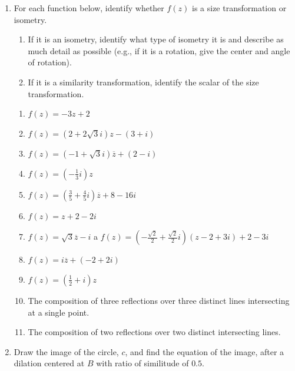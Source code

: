 \documentclass[
]{book}
\providecommand{\tightlist}{%
  \setlength{\itemsep}{0pt}\setlength{\parskip}{0pt}}
\theoremstyle{definition}
\theoremstyle{definition}
\theoremstyle{definition}
\theoremstyle{definition}
\theoremstyle{remark}
\begin{document}
\begin{enumerate}
\def\labelenumi{\arabic{enumi}.}
\item
  For each function below, identify whether \(f(z)\) is a size transformation or isometry.

  \begin{enumerate}
  \def\labelenumii{\roman{enumii}.}
  \tightlist
  \item
    If it is an isometry, identify what type of isometry it is and describe as much detail as possible (e.g., if it is a rotation, give the center and angle of rotation).
  \item
    If it is a similarity transformation, identify the scalar of the size transformation.
  \end{enumerate}

  \begin{enumerate}
  \def\labelenumii{\alph{enumii}.}
  \tightlist
  \item
    \({\displaystyle f(z)= -3z+2 }\)
  \item
    \({\displaystyle f(z)= (2+2\sqrt{3}i)z - (3+i)}\)
  \item
    \({\displaystyle f(z)= (-1+\sqrt{3}i)\overline{z} + (2-i)}\)
  \item
    \({\displaystyle f(z)= \left(-\frac{1}{3}i\right)z}\)
  \item
    \({\displaystyle f(z)=\left( \frac{3}{5}+\frac{4}{5}i\right) \overline{z} + 8 -16i}\)
  \item
    \({\displaystyle f(z)= z+2-2i}\)
  \item
    \({\displaystyle f(z)=\sqrt{3} \overline{z} -i}\)
    a \({\displaystyle f(z)=\left(-\frac{\sqrt{2}}{2}+\frac{\sqrt{2}}{2}i\right) (z-2+3i) + 2-3i }\)
  \item
    \({\displaystyle f(z)=i \overline{z} + (-2+2i)}\)
  \item
    \({\displaystyle f(z)=\left(\frac{1}{2}+i\right)z}\)
  \item
    The composition of three reflections over three distinct lines intersecting at a single point.
  \item
    The composition of two reflections over two distinct intersecting lines.
  \end{enumerate}
\item
  Draw the image of the circle, \(c\), and find the equation of the image, after a dilation centered at \(B\) with ratio of similitude of \(0.5\).
\end{enumerate}
\end{document}
